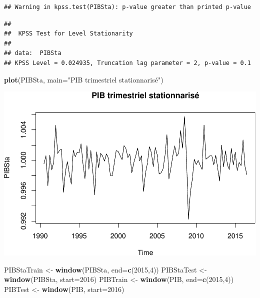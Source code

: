 \documentclass[11pt,]{article}
\newenvironment{Shaded}{\begin{snugshade}}{\end{snugshade}}
\newcommand{\KeywordTok}[1]{\textcolor[rgb]{0.13,0.29,0.53}{\textbf{{#1}}}}
\newcommand{\DataTypeTok}[1]{\textcolor[rgb]{0.13,0.29,0.53}{{#1}}}
\newcommand{\DecValTok}[1]{\textcolor[rgb]{0.00,0.00,0.81}{{#1}}}
\newcommand{\StringTok}[1]{\textcolor[rgb]{0.31,0.60,0.02}{{#1}}}
\newcommand{\NormalTok}[1]{{#1}}
\begin{document}
\begin{verbatim}
## Warning in kpss.test(PIBSta): p-value greater than printed p-value
\end{verbatim}

\begin{verbatim}
## 
##  KPSS Test for Level Stationarity
## 
## data:  PIBSta
## KPSS Level = 0.024935, Truncation lag parameter = 2, p-value = 0.1
\end{verbatim}

\begin{Shaded}
\begin{Highlighting}[]
  \KeywordTok{plot}\NormalTok{(PIBSta, }\DataTypeTok{main=}\StringTok{"PIB trimestriel stationnarisé"}\NormalTok{)}
\end{Highlighting}
\end{Shaded}

\includegraphics{doc_files/figure-latex/unnamed-chunk-7-2.pdf}

\begin{Shaded}
\begin{Highlighting}[]
  \NormalTok{PIBStaTrain <-}\StringTok{ }\KeywordTok{window}\NormalTok{(PIBSta, }\DataTypeTok{end=}\KeywordTok{c}\NormalTok{(}\DecValTok{2015}\NormalTok{,}\DecValTok{4}\NormalTok{))}
  \NormalTok{PIBStaTest <-}\StringTok{ }\KeywordTok{window}\NormalTok{(PIBSta, }\DataTypeTok{start=}\DecValTok{2016}\NormalTok{)}
  \NormalTok{PIBTrain <-}\StringTok{ }\KeywordTok{window}\NormalTok{(PIB, }\DataTypeTok{end=}\KeywordTok{c}\NormalTok{(}\DecValTok{2015}\NormalTok{,}\DecValTok{4}\NormalTok{))}
  \NormalTok{PIBTest <-}\StringTok{ }\KeywordTok{window}\NormalTok{(PIB, }\DataTypeTok{start=}\DecValTok{2016}\NormalTok{)}
\end{Highlighting}
\end{Shaded}
\end{document}

